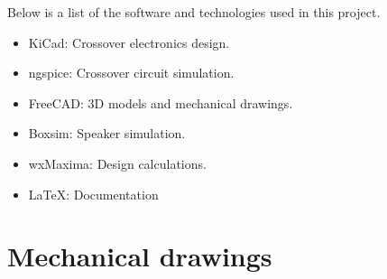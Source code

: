 \documentclass[10pt]{article}
\begin{document}
Below is a list of the software and technologies used in this project.

\begin{itemize}
\item KiCad: Crossover electronics design.
\item ngspice: Crossover circuit simulation.
\item FreeCAD: 3D models and mechanical drawings.
\item Boxsim: Speaker simulation.
\item wxMaxima: Design calculations.
\item LaTeX: Documentation
\end{itemize}

\pagebreak
\null
\vfil
\centering\section{Mechanical drawings}
\vfil
\pagebreak




\end{document}
